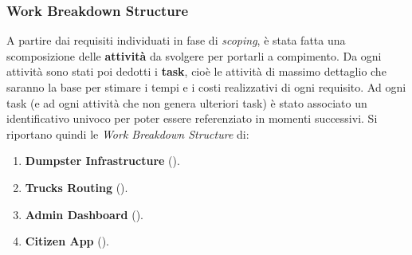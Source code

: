 \subsubsection{Work Breakdown Structure}
A partire dai requisiti individuati in fase di \textit{scoping}, è stata fatta una scomposizione delle \textbf{attività} da svolgere per portarli a compimento.
Da ogni attività sono stati poi dedotti i \textbf{task}, cioè le attività di massimo dettaglio che saranno la base per stimare i tempi e i costi realizzativi di ogni requisito.
Ad ogni task (e ad ogni attività che non genera ulteriori task) è stato associato un identificativo univoco per poter essere referenziato in momenti successivi.
Si riportano quindi le \textit{Work Breakdown Structure} di:
\begin{enumerate}
    \item \textbf{Dumpster Infrastructure} ().
    \item \textbf{Trucks Routing} ().
    \item \textbf{Admin Dashboard} ().
    \item \textbf{Citizen App} ().
\end{enumerate}

